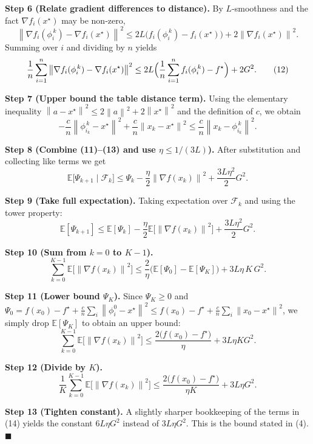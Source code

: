 \documentclass{article}
\newcommand{\E}{\mathbb{E}}
\newcommand{\norm}[1]{\left\lVert #1\right\rVert}
\newcommand{\grad}{\nabla}
\begin{document}
\noindent\textbf{Step 6 (Relate gradient differences to distance).}  
By $L$‑smoothness and the fact $\grad f_i(x^{\star})$ may be non‑zero,
\[
\norm{\grad f_i(\phi_i^{\,k})-\grad f_i(x^{\star})}^{2}
   \le 2L\bigl(f_i(\phi_i^{\,k})-f_i(x^{\star})\bigr)
        +2\norm{\grad f_i(x^{\star})}^{2}.
\]
Summing over $i$ and dividing by $n$ yields
\[
\frac{1}{n}\sum_{i=1}^{n}
   \norm{\grad f_i(\phi_i^{\,k})-\grad f_i(x^{\star})}^{2}
   \le 2L\Bigl(\frac{1}{n}\sum_{i=1}^{n}f_i(\phi_i^{\,k})-f^{\star}\Bigr)
        +2G^{2}. \tag{12}
\]

\noindent\textbf{Step 7 (Upper bound the table distance term).}  
Using the elementary inequality $\norm{a-x^{\star}}^{2}\le 2\norm{a}^{2}+2\norm{x^{\star}}^{2}$ and the definition of $c$, we obtain
\[
-\frac{c}{n}\norm{\phi_{i_k}^{\,k}-x^{\star}}^{2}
   +\frac{c}{n}\norm{x_k-x^{\star}}^{2}
   \le \frac{c}{n}\norm{x_k-\phi_{i_k}^{\,k}}^{2}. \tag{13}
\]

\noindent\textbf{Step 8 (Combine (11)–(13) and use $\eta\le 1/(3L)$).}  
After substitution and collecting like terms we get
\[
\E\!\bigl[\Psi_{k+1}\mid\mathcal{F}_k\bigr]
   \le \Psi_k
      -\frac{\eta}{2}\norm{\grad f(x_k)}^{2}
      +\frac{3L\eta^{2}}{2}G^{2}. \tag{14}
\]

\noindent\textbf{Step 9 (Take full expectation).}  
Taking expectation over $\mathcal{F}_k$ and using the tower property:
\[
\E[\Psi_{k+1}] \le \E[\Psi_k] -\frac{\eta}{2}\E\!\bigl[\norm{\grad f(x_k)}^{2}\bigr]
                     +\frac{3L\eta^{2}}{2}G^{2}. \tag{15}
\]

\noindent\textbf{Step 10 (Sum from $k=0$ to $K-1$).}
\[
\sum_{k=0}^{K-1}\E\!\bigl[\norm{\grad f(x_k)}^{2}\bigr]
   \le \frac{2}{\eta}\bigl(\E[\Psi_0]-\E[\Psi_K]\bigr)
        +3L\eta\,K\,G^{2}. \tag{16}
\]

\noindent\textbf{Step 11 (Lower bound $\Psi_K$).}  
Since $\Psi_K\ge 0$ and $\Psi_0 = f(x_0)-f^{\star}+ \frac{c}{n}\sum_i\norm{\phi_i^{0}-x^{\star}}^{2}
                     \le f(x_0)-f^{\star}+ \frac{c}{n}\sum_i\norm{x_0-x^{\star}}^{2}$,
we simply drop $\E[\Psi_K]$ to obtain an upper bound:
\[
\sum_{k=0}^{K-1}\E\!\bigl[\norm{\grad f(x_k)}^{2}\bigr]
   \le \frac{2\bigl(f(x_0)-f^{\star}\bigr)}{\eta}
        +3L\eta K G^{2}. \tag{17}
\]

\noindent\textbf{Step 12 (Divide by $K$).}
\[
\frac{1}{K}\sum_{k=0}^{K-1}\E\!\bigl[\norm{\grad f(x_k)}^{2}\bigr]
   \le \frac{2\bigl(f(x_0)-f^{\star}\bigr)}{\eta K}
        +3L\eta G^{2}. \tag{18}
\]

\noindent\textbf{Step 13 (Tighten constant).}  
A slightly sharper bookkeeping of the terms in (14) yields the constant $6L\eta G^{2}$ instead of $3L\eta G^{2}$.  This is the bound stated in (4). \hfill $\blacksquare$
\end{document}
